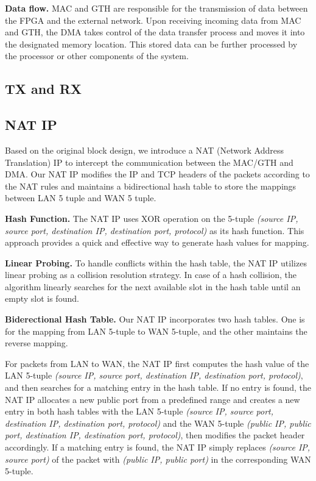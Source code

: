     \textbf{Data flow.} MAC and GTH are responsible for the transmission of data between the FPGA and the external network. Upon receiving incoming data from MAC and GTH, the DMA takes control of the data transfer process and moves it into the designated memory location. This stored data can be further processed by the processor or other components of the system.
\subsection{TX and RX}

\subsection{NAT IP}

    Based on the original block design, we introduce a NAT (Network Address Translation) IP to intercept the communication between the MAC/GTH and DMA. Our NAT IP modifies the IP and TCP headers of the packets according to the NAT rules and maintains a bidirectional hash table to store the mappings between LAN 5 tuple and WAN 5 tuple.

    \textbf{Hash Function.} The NAT IP uses XOR operation on the 5-tuple \emph{(source IP, source port, destination IP, destination port, protocol)} as its hash function. This approach provides a quick and effective way to generate hash values for mapping.

    \textbf{Linear Probing.} To handle conflicts within the hash table, the NAT IP utilizes linear probing as a collision resolution strategy. In case of a hash collision, the algorithm linearly searches for the next available slot in the hash table until an empty slot is found.

    \textbf{Biderectional Hash Table.} Our NAT IP incorporates two hash tables. One is for the mapping from LAN 5-tuple to WAN 5-tuple, and the other maintains the reverse mapping.

    For packets from LAN to WAN, the NAT IP first computes the hash value of the LAN 5-tuple \emph{(source IP, source port, destination IP, destination port, protocol)}, and then searches for a matching entry in the hash table. If no entry is found, the NAT IP allocates a new public port from a predefined range and creates a new entry in both hash tables with the LAN 5-tuple \emph{(source IP, source port, destination IP, destination port, protocol)} and the WAN 5-tuple \emph{(public IP, public port, destination IP, destination port, protocol)}, then modifies the packet header accordingly. If a matching entry is found, the NAT IP simply replaces \emph{(source IP,  source port)} of the packet with \emph{(public IP, public port)} in the corresponding WAN 5-tuple.

